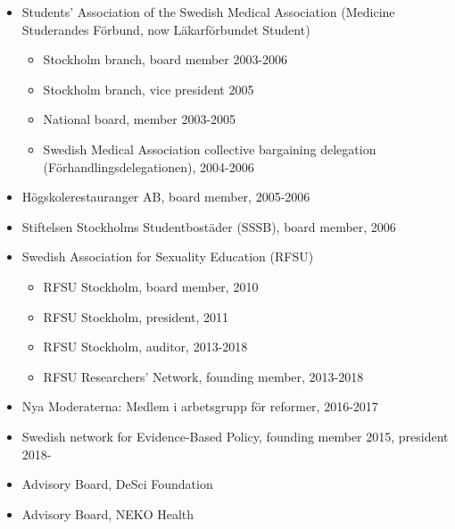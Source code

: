 \documentclass[10pt,a4paper,twocolumn]{article}
\begin{document}
\begin{itemize}
\begin{itemize}
        \item Board, member 2004

    \end{itemize}


    \item Students' Association of the Swedish Medical Association (Medicine Studerandes Förbund, now Läkarförbundet Student)

    \begin{itemize}

        \item Stockholm branch, board member 2003-2006

        \item Stockholm branch, vice president 2005

        \item National board, member 2003-2005

        \item Swedish Medical Association collective bargaining delegation (Förhandlingsdelegationen), 2004-2006

    \end{itemize}


    \item Högskolerestauranger AB, board member, 2005-2006


    \item Stiftelsen Stockholms Studentbostäder (SSSB), board member, 2006


    \item Swedish Association for Sexuality Education (RFSU)

    \begin{itemize}

        \item RFSU Stockholm, board member, 2010

        \item RFSU Stockholm, president, 2011

        \item RFSU Stockholm, auditor, 2013-2018

        \item RFSU Researchers' Network, founding member, 2013-2018

    \end{itemize}


    \item Nya Moderaterna: Medlem i arbetsgrupp för reformer, 2016-2017


    \item Swedish network for Evidence-Based Policy, founding member 2015, president 2018-


    \item Advisory Board, DeSci Foundation


    \item Advisory Board, NEKO Health


\end{itemize}
\end{document}
